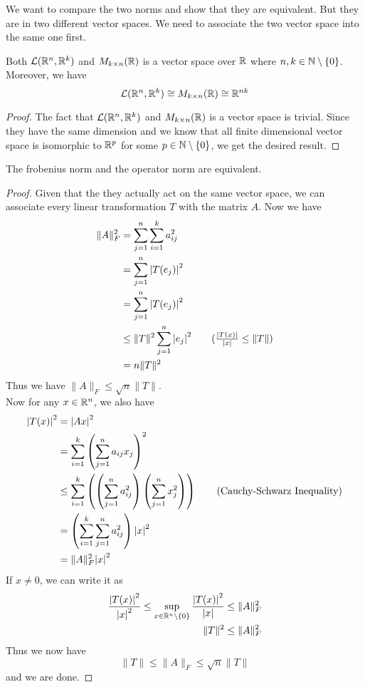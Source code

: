 \documentclass[a4paper]{article}
\begin{document}
We want to compare the two norms and show that they are equivalent. But they are in two different vector spaces. We need to associate the two vector space into the same one first. 

\begin{prp}{}{} Both $\mathcal{L}(\mathbb{R}^n,\mathbb{R}^k)$ and $M_{k\times n}(\mathbb{R})$ is a vector space over $\mathbb{R}$ where $n,k\in\mathbb{N}\setminus\{0\}$. Moreover, we have $$\mathcal{L}(\mathbb{R}^n,\mathbb{R}^k)\cong M_{k\times n}(\mathbb{R})\cong\mathbb{R}^{nk}$$ 
\begin{proof}
The fact that $\mathcal{L}(\mathbb{R}^n,\mathbb{R}^k)$ and $M_{k\times n}(\mathbb{R})$ is a vector space is trivial. Since they have the same dimension and we know that all finite dimensional vector space is isomorphic to $\mathbb{R}^p$ for some $p\in\mathbb{N}\setminus\{0\}$, we get the desired result. 
\end{proof}
\end{prp}

\begin{prp}{}{} The frobenius norm and the operator norm are equivalent. 
\begin{proof}
Given that the they actually act on the same vector space, we can associate every linear transformation $T$ with the matrix $A$. Now we have 
\begin{align*}
\|A\|_F^2&=\sum_{j=1}^n\sum_{i=1}^ka_{ij}^2\\
&=\sum_{j=1}^n\abs{T(e_j)}^2\\
&=\sum_{j=1}^n\abs{T(e_j)}^2\\
&\leq\|T\|^2\sum_{j=1}^n\abs{e_j}^2\tag{$\frac{\abs{T(x)}}{\abs{x}}\leq\|T\|$}\\
&=n\|T\|^2
\end{align*}
Thus we have $\|A\|_F\leq\sqrt{n}\|T\|$. \\
Now for any $x\in\mathbb{R}^n$, we also have 
\begin{align*}
\abs{T(x)}^2&=\abs{Ax}^2\\
&=\sum_{i=1}^k\left(\sum_{j=1}^na_{ij}x_j\right)^2\\
&\leq\sum_{i=1}^k\left(\left(\sum_{j=1}^na_{ij}^2\right)\left(\sum_{j=1}^nx_j^2\right)\right)\tag{Cauchy-Schwarz Inequality}\\
&=\left(\sum_{i=1}^k\sum_{j=1}^na_{ij}^2\right)\abs{x}^2\\
&=\|A\|_F^2\abs{x}^2
\end{align*}
If $x\neq 0$, we can write it as 
\begin{align*}
\frac{\abs{T(x)}^2}{\abs{x}^2}\leq\sup_{x\in\mathbb{R}^n\setminus\{0\}}\frac{\abs{T(x)}^2}{\abs{x}}&\leq\|A\|_F^2\\
\|T\|^2&\leq\|A\|_F^2
\end{align*}
Thus we now have $$\|T\|\leq\|A\|_F\leq\sqrt{n}\|T\|$$ and we are done. 
\end{proof}
\end{prp}
\end{document}
